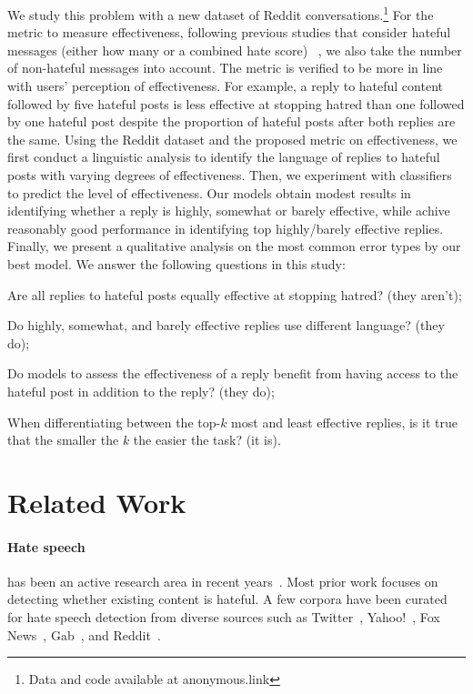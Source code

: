 \documentclass[11pt]{article}
\begin{document}
We study this problem with a new dataset of Reddit conversations.\footnote{Data and code available at anonymous.link}
For the metric to measure effectiveness, 
following previous studies that consider hateful messages (either how many or a combined hate score) ~\cite{DBLP:conf/icwsm/LiuGHC18,DBLP:conf/kdd/DahiyaSSGCEMB021,garland2022impact}, we also take the number of non-hateful messages into account.
The metric is verified to be more in line with users' perception of effectiveness. 
For example, a reply to hateful content followed by five hateful posts is less effective at stopping hatred than one followed by one hateful post
despite the proportion of hateful posts after both replies are the same.
Using the Reddit dataset and the proposed metric on effectiveness,
we first conduct a linguistic analysis to identify the language of replies to hateful posts with varying degrees of effectiveness. 
Then, we experiment with classifiers to predict the level of effectiveness. 
Our models obtain modest results in identifying whether a reply is highly, somewhat or barely effective, while achive reasonably good performance in identifying top highly/barely effective replies. 
Finally, we present a qualitative analysis on the most common error types by our best model.
We answer the following questions in this study:
\begin{compactenum}
	\item Are all replies to hateful posts equally effective at stopping hatred? (they aren't);
	\item Do highly, somewhat, and barely effective replies use different language? (they do);
	\item Do models to assess the effectiveness of a reply benefit from having access to the hateful post in addition to the reply? (they do);
	\item When differentiating between the top-$k$ most and least effective replies,
	is it true that the smaller the $k$ the easier the task? (it is).
\end{compactenum}


\section{Related Work}
\label{s:related_work}
\paragraph{Hate speech}
has been an active research area in recent years~\cite{fortuna2018survey}. 
Most prior work focuses on detecting whether existing content is hateful.
A few corpora have been curated for hate speech detection from diverse sources such as
Twitter~\cite{waseem-hovy-2016-hateful, hateoffensive},
Yahoo!~\cite{nobata2016abusive},
Fox News~\cite{gao-huang-2017-detecting},
Gab~\cite{DBLP:conf/aaai/MathewSYBG021},
and Reddit~\cite{qian-etal-2019-benchmark}. 
\end{document}
